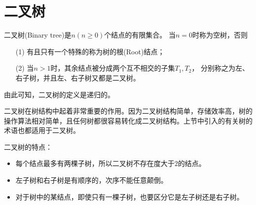 \section{二叉树}

\begin{frame}
\begin{dingyi}
二叉树(Binary tree)是$n(n\ge0)$个结点的有限集合。
当$n=0$时称为空树，否则
\begin{itemize}
\item[(1)]有且只有一个特殊的称为树的根(Root)结点；
\item[(2)]当$n>1$时，其余结点被分成两个互不相交的子集$T_1,T_2$，
分别称之为左、右子树，并且左、右子树又都是二叉树。
\end{itemize}
由此可知，二叉树的定义是递归的。
\end{dingyi}
\end{frame}

%
%
\begin{frame}
二叉树在树结构中起着非常重要的作用。因为二叉树结构简单，存储效率高，树的操作算法相对简单，且任何树都很容易转化成二叉树结构。上节中引入的有关树的术语也都适用于二叉树。
\end{frame}
%
\begin{frame}
\textcolor{acolor5}{二叉树的特点：}
  \begin{itemize}
  \item 每个结点最多有两棵子树，所以二叉树不存在度大于$2$的结点。
  \item 左子树和右子树是有顺序的，次序不能任意颠倒。\\[0.1in]
  \item 对于树中的某结点，即使只有一棵子树，也要区分它是左子树还是右子树。
  \end{itemize}
\end{frame}

